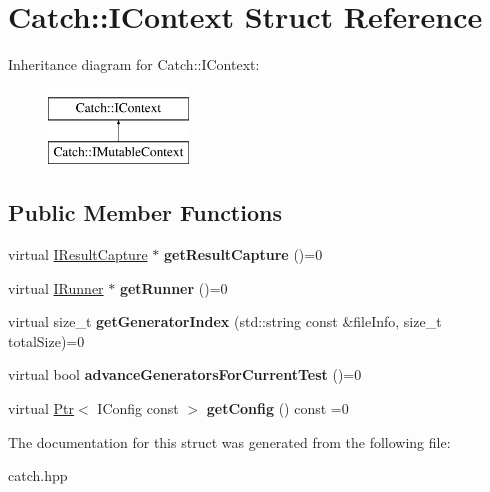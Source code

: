 \hypertarget{structCatch_1_1IContext}{}\section{Catch\+:\+:I\+Context Struct Reference}
\label{structCatch_1_1IContext}
Inheritance diagram for Catch\+:\+:I\+Context\+:\begin{figure}[H]
\begin{center}
\leavevmode
\includegraphics[height=2.000000cm]{structCatch_1_1IContext}
\end{center}
\end{figure}
\subsection*{Public Member Functions}
\begin{DoxyCompactItemize}
\item 
\mbox{\label{structCatch_1_1IContext_a684e4ae71d1fdf3060c352ecde1d122f}} 
virtual \hyperlink{structCatch_1_1IResultCapture}{I\+Result\+Capture} $\ast$ {\bfseries get\+Result\+Capture} ()=0
\item 
\mbox{\label{structCatch_1_1IContext_af088415dde18d039ed5a2f95b02767c6}} 
virtual \hyperlink{structCatch_1_1IRunner}{I\+Runner} $\ast$ {\bfseries get\+Runner} ()=0
\item 
\mbox{\label{structCatch_1_1IContext_a43e07088db43299ba129fbe6d3106e95}} 
virtual size\+\_\+t {\bfseries get\+Generator\+Index} (std\+::string const \&file\+Info, size\+\_\+t total\+Size)=0
\item 
\mbox{\label{structCatch_1_1IContext_a806f7c4ed24d51adae90418e661b24b7}} 
virtual bool {\bfseries advance\+Generators\+For\+Current\+Test} ()=0
\item 
\mbox{\label{structCatch_1_1IContext_aee81c415899262e096ad8d6f686fa365}} 
virtual \hyperlink{classCatch_1_1Ptr}{Ptr}$<$ I\+Config const  $>$ {\bfseries get\+Config} () const =0
\end{DoxyCompactItemize}


The documentation for this struct was generated from the following file\+:\begin{DoxyCompactItemize}
\item 
catch.\+hpp\end{DoxyCompactItemize}
